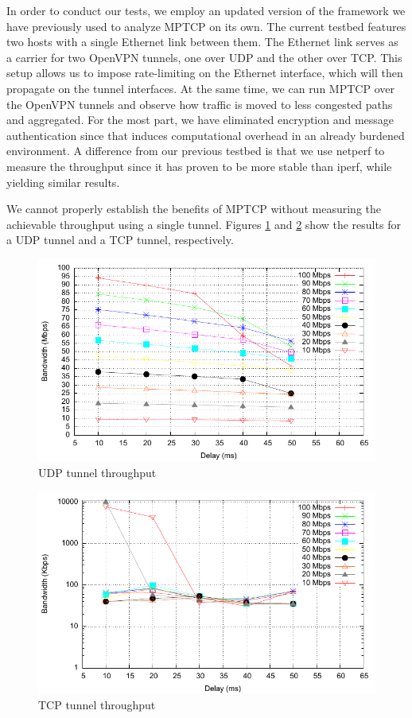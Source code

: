 
In order to conduct our tests, we employ an updated version of the framework
we have previously used to analyze MPTCP on its own\cite{sem1}. The current
testbed features two hosts with a single Ethernet link between them. The
Ethernet link serves as a carrier for two OpenVPN tunnels, one over UDP and
the other over TCP. This setup allows us to impose rate-limiting on the Ethernet
interface, which will then propagate on the tunnel interfaces. At the same
time, we can run MPTCP over the OpenVPN tunnels and observe how traffic is
moved to less congested paths and aggregated. For the most part, we have
eliminated encryption and message authentication since that induces
computational overhead in an already burdened environment. A difference from
our previous testbed is that we use netperf to measure the throughput since it
has proven to be more stable than iperf, while yielding similar results.

We cannot properly establish the benefits of MPTCP without measuring the
achievable throughput using a single tunnel. Figures \ref{fig:udp} and
\ref{fig:tcp} show the results for a UDP tunnel and a TCP tunnel,
respectively.

\begin{figure}
  \centering
  \includegraphics[width=\textwidth]{img/test-udp}
  \caption{UDP tunnel throughput}
  \label{fig:udp}
\end{figure}

\begin{figure}
  \centering
  \includegraphics[width=\textwidth]{img/test-tcp}
  \caption{TCP tunnel throughput}
  \label{fig:tcp}
\end{figure}

